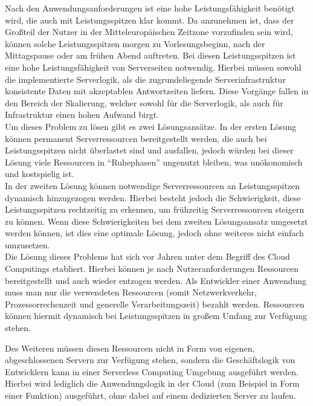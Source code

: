 Nach den Anwendungsanforderungen ist eine hohe Leistungsfähigkeit benötigt wird, die auch mit Leistungsspitzen klar kommt. Da anzunehmen ist, dass der Großteil der Nutzer in der Mitteleuropäischen Zeitzone vorzufinden sein wird, können solche Leistungsspitzen morgen zu Vorlesungsbeginn, nach der Mittagspause oder am frühen Abend auftreten. Bei diesen Leistungsspitzen ist eine hohe Leistungsfähigkeit von Serverseiten notwendig. Hierbei müssen sowohl die implementierte Serverlogik, als die zugrundeliegende Serverinfrastruktur konsistente Daten mit akzeptablen Antwortzeiten liefern. Diese Vorgänge fallen in den Bereich der Skalierung, welcher sowohl für die Serverlogik, als auch für Infrastruktur einen hohen Aufwand birgt.\\
Um dieses Problem zu lösen gibt es zwei Lösungsansätze. In der ersten Lösung können permanent Serverressourcen bereitgestellt werden, die auch bei Leistungsspitzen nicht überlastet sind und ausfallen, jedoch würden bei dieser Lösung viele Ressourcen in \enquote{Ruhephasen} ungenutzt bleiben, was unökonomisch und kostspielig ist.\\
In der zweiten Lösung können notwendige Serverressourcen an Leistungsspitzen dynamisch hinzugezogen werden. Hierbei besteht jedoch die Schwierigkeit, diese Leistungsspitzen rechtzeitig zu erkennen, um frühzeitig Serverressourcen steigern zu können. Wenn diese Schwierigkeiten bei dem zweiten Lösungsansatz umgesetzt werden können, ist dies eine optimale Lösung, jedoch ohne weiteres nicht einfach umzusetzen.\\
Die Lösung dieses Problems hat sich vor Jahren unter dem Begriff des Cloud Computings \autocite{definitionOfCloudComputing} etabliert. Hierbei können je nach Nutzeranforderungen Ressourcen bereitgestellt und auch wieder entzogen werden. Als Entwickler einer Anwendung muss man nur die verwendeten Ressourcen (somit Netzwerkverkehr, Prozessorrechenzeit und generelle Verarbeitungszeit) bezahlt werden. Ressourcen können hiermit dynamisch bei Leistungsspitzen in großem Umfang zur Verfügung stehen.%

Des Weiteren müssen diesen Ressourcen nicht in Form von eigenen, abgeschlossenen Servern zur Verfügung stehen, sondern die Geschäftslogik von Entwicklern kann in einer Serverless Computing Umgebung \autocite{definitionOfServerlessComputing} ausgeführt werden. Hierbei wird lediglich die Anwendungslogik in der Cloud (zum Beispiel in Form einer Funktion) ausgeführt, ohne dabei auf einem dedizierten Server zu laufen.

